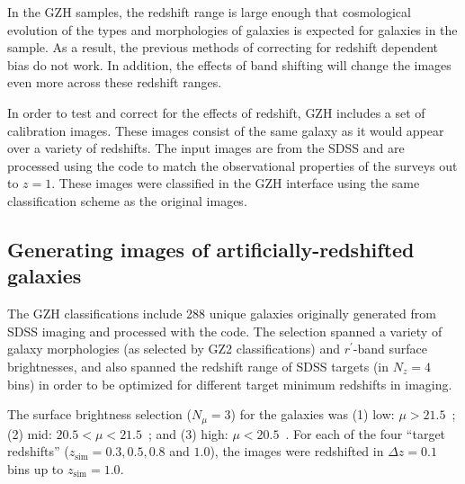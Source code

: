 \documentclass[twocolumn]{aastex6}
\begin{document}
In the GZH samples, the redshift range is large enough that cosmological evolution of the types and morphologies of galaxies is expected for galaxies in the sample. As a result, the previous methods of correcting for redshift dependent bias do not work. In addition, the effects of band shifting will change the images even more across these redshift ranges. %

In order to test and correct for the effects of redshift, GZH includes a set of calibration images. These images consist of the same galaxy as it would appear over a variety of redshifts. The input images are from the SDSS \citep{yor00,str02} and are processed using the \ferengi{} code \citep{bar08a} to match the observational properties of the \hst{} surveys out to $z=1$. These images were classified in the GZH interface using the same classification scheme as the original \hst{} images.
 
\subsection{Generating images of artificially-redshifted galaxies}

The GZH classifications include 288 unique galaxies originally generated from SDSS imaging and processed with the \ferengi{} code. The selection spanned a variety of galaxy morphologies (as selected by GZ2 classifications) and $r^\prime$-band surface brightnesses, and also spanned the redshift range of SDSS targets (in $N_z = 4$ bins) in order to be optimized for different target minimum redshifts in \hst{} imaging. 

The surface brightness selection ($N_\mu = 3$) for the \ferengi{} galaxies was (1) low: $\mu > 21.5$~\magarc;  (2) mid: $20.5 < \mu < 21.5$~\magarc; and (3) high: $\mu < 20.5$~\magarc. For each of the four ``target redshifts'' ($z_\mathrm{sim} = 0.3, 0.5, 0.8$ and $1.0$), the images were redshifted in $\Delta z = 0.1$ bins up to $z_\mathrm{sim}=1.0$. 
 
\end{document}
